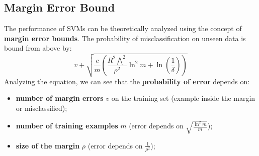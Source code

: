 \subsection{Margin Error Bound}
The performance of SVMs can be theoretically analyzed using the concept of \textbf{margin error bounds}.
The probability of misclassification on unseen data is bound from above by:
\begin{equation}
    v + \sqrt{\frac{c}{m} \left( \frac{R^2\bigwedge^2 }{\rho^2} \ln ^2 m + \ln(\frac{1}{\delta})\right)} 
\end{equation}
Analyzing the equation, we can see that the \textbf{probability of error} depends on:
\begin{itemize}
    \item \textbf{number of margin errors} $v$ on the training set (example inside the margin or misclassified);
    \item \textbf{number of training examples} $m$ (error depends on $\sqrt{\frac{\ln^2 m}{m}}$);
    \item \textbf{size of the margin} $\rho$ (error depends on $\frac{1}{\rho^2}$);
\end{itemize}